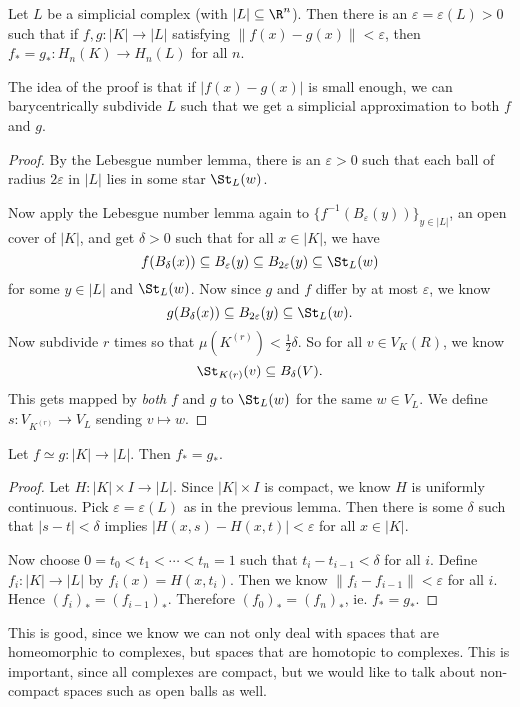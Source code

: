 \documentclass[a4paper]{article}
\begin{document}
\begin{lemma}
  Let $L$ be a simplicial complex (with $|L| \subseteq \R^n$). Then there is an $\varepsilon = \varepsilon(L) > 0$ such that if $f, g: |K| \to |L|$ satisfying $\|f(x) - g(x)\| < \varepsilon$, then $f_* = g_*: H_n(K) \to H_n(L)$ for all $n$.
\end{lemma}
The idea of the proof is that if $|f(x) - g(x)|$ is small enough, we can barycentrically subdivide $L$ such that we get a simplicial approximation to both $f$ and $g$.
\begin{proof}
  By the Lebesgue number lemma, there is an $\varepsilon > 0$ such that each ball of radius $2\varepsilon$ in $|L|$ lies in some star $\St_L(w)$.

  Now apply the Lebesgue number lemma again to $\{f^{-1}(B_\varepsilon(y))\}_{y \in |L|}$, an open cover of $|K|$, and get $\delta > 0$ such that for all $x \in |K|$, we have
  \[
    f(B_\delta(x)) \subseteq B_\varepsilon(y) \subseteq B_{2\varepsilon}(y) \subseteq \St_L(w)
  \]
  for some $y \in |L|$ and $\St_L(w)$. Now since $g$ and $f$ differ by at most $\varepsilon$, we know
  \[
    g(B_\delta(x)) \subseteq B_{2\varepsilon}(y) \subseteq \St_L(w).
  \]
  Now subdivide $r$ times so that $\mu(K^{(r)}) < \frac{1}{2} \delta$. So for all $v \in V_K(R)$, we know
  \[
    \St_{K(r)} (v) \subseteq B_\delta(V).
  \]
  This gets mapped by \emph{both} $f$ and $g$ to $\St_L(w)$ for the same $w \in V_L$. We define $s: V_{K^{(r)}} \to V_L$ sending $v \mapsto w$.
\end{proof}

\begin{thm}
  Let $f\simeq g: |K| \to |L|$. Then $f_* = g_*$.
\end{thm}

\begin{proof}
  Let $H: |K| \times I \to |L|$. Since $|K|\times I$ is compact, we know $H$ is uniformly continuous. Pick $\varepsilon = \varepsilon(L)$ as in the previous lemma. Then there is some $\delta$ such that $|s - t| < \delta$ implies $|H(x, s) - H(x, t)| < \varepsilon$ for all $x \in |K|$.

  Now choose $0 = t_0 < t_1 < \cdots < t_n = 1$ such that $t_i - t_{i - 1} < \delta$ for all $i$. Define $f_i: |K| \to |L|$ by $f_i(x) = H(x, t_i)$. Then we know $\|f_i - f_{i - 1}\| < \varepsilon$ for all $i$. Hence $(f_i)_* = (f_{i - 1})_*$. Therefore $(f_0)_* = (f_n)_*$, ie. $f_* = g_*$.
\end{proof}

This is good, since we know we can not only deal with spaces that are homeomorphic to complexes, but spaces that are homotopic to complexes. This is important, since all complexes are compact, but we would like to talk about non-compact spaces such as open balls as well.
\end{document}
